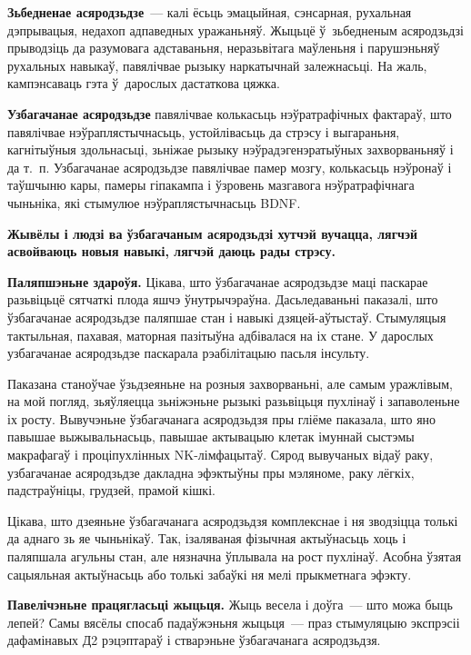 \textbf{Зьбедненае асяродзьдзе}~--- калі ёсьць эмацыйная, сэнсарная, рухальная дэпрывацыя, недахоп адпаведных уражаньняў. Жыцьцё ў~зьбедненым асяродзьдзі прыводзіць да разумовага адставаньня, неразьвітага маўленьня і парушэньняў рухальных навыкаў, павялічвае рызыку наркатычнай залежнасьці. На жаль, кампэнсаваць гэта ў~дарослых дастаткова цяжка.

\textbf{Узбагачанае асяродзьдзе} павялічвае колькасьць нэўратрафічных фактараў, што павялічвае нэўраплястычнасьць, устойлівасьць да стрэсу і выгараньня, кагнітыўныя здольнасьці, зьніжае рызыку нэўрадэгенэратыўных захворваньняў і да т.~п. Узбагачанае асяродзьдзе павялічвае памер мозгу, колькасьць нэўронаў і таўшчыню кары, памеры гіпакампа і ўзровень мазгавога нэўратрафічнага чыньніка, які стымулюе нэўраплястычнасьць BDNF. 

\textbf{Жывёлы і людзі ва ўзбагачаным асяродзьдзі хутчэй вучацца, лягчэй асвойваюць новыя навыкі, лягчэй даюць рады стрэсу.} 

\textbf{Паляпшэньне здароўя.} Цікава, што ўзбагачанае асяродзьдзе маці паскарае разьвіцьцё сятчаткі плода яшчэ ўнутрычэраўна. Дасьледаваньні паказалі, што ўзбагачанае асяродзьдзе паляпшае стан і навыкі дзяцей-аўтыстаў. Стымуляцыя тактыльная, пахавая, маторная пазітыўна адбівалася на іх стане. У дарослых узбагачанае асяродзьдзе паскарала рэабілітацыю пасьля інсульту.

Паказана станоўчае ўзьдзеяньне на розныя захворваньні, але самым уражлівым, на мой погляд, зьяўляецца зьніжэньне рызыкі разьвіцьця пухлінаў і запаволеньне іх росту. Вывучэньне ўзбагачанага асяродзьдзя пры гліёме паказала, што яно павышае выжывальнасьць, павышае актывацыю клетак імуннай сыстэмы макрафагаў і проціпухлінных NK-лімфацытаў. Сярод вывучаных відаў раку, узбагачанае асяродзьдзе дакладна эфэктыўны пры мэляноме, раку лёгкіх, падстраўніцы, грудзей, прамой кішкі. 


Цікава, што дзеяньне ўзбагачанага асяродзьдзя комплекснае і ня зводзіцца толькі да аднаго зь яе чыньнікаў. Так, ізаляваная фізычная актыўнасьць хоць і паляпшала агульны стан, але нязначна ўплывала на рост пухлінаў. Асобна ўзятая сацыяльная актыўнасьць або толькі забаўкі ня мелі прыкметнага эфэкту. 

\textbf{Павелічэньне працягласьці жыцьця.} Жыць весела і доўга~--- што можа быць лепей? Самы вясёлы спосаб падаўжэньня жыцьця~--- праз стымуляцыю экспрэсіі дафамінавых Д2 рэцэптараў і стварэньне ўзбагачанага асяродзьдзя.

